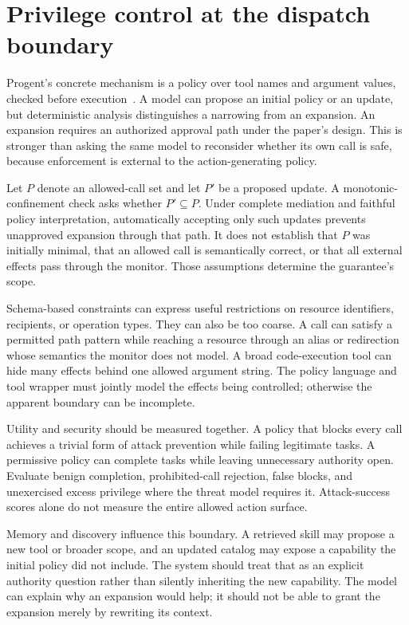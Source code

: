 \section{Privilege control at the dispatch boundary}\label{sec:C18:privilege}
Progent's concrete mechanism is a policy over tool names and argument values, checked before execution~\cite{corpus250411703}. A model can propose an initial policy or an update, but deterministic analysis distinguishes a narrowing from an expansion. An expansion requires an authorized approval path under the paper's design. This is stronger than asking the same model to reconsider whether its own call is safe, because enforcement is external to the action-generating policy.

Let $P$ denote an allowed-call set and let $P'$ be a proposed update. A monotonic-confinement check asks whether $P'\subseteq P$. Under complete mediation and faithful policy interpretation, automatically accepting only such updates prevents unapproved expansion through that path. It does not establish that $P$ was initially minimal, that an allowed call is semantically correct, or that all external effects pass through the monitor. Those assumptions determine the guarantee's scope.

Schema-based constraints can express useful restrictions on resource identifiers, recipients, or operation types. They can also be too coarse. A call can satisfy a permitted path pattern while reaching a resource through an alias or redirection whose semantics the monitor does not model. A broad code-execution tool can hide many effects behind one allowed argument string. The policy language and tool wrapper must jointly model the effects being controlled; otherwise the apparent boundary can be incomplete.

Utility and security should be measured together. A policy that blocks every call achieves a trivial form of attack prevention while failing legitimate tasks. A permissive policy can complete tasks while leaving unnecessary authority open. Evaluate benign completion, prohibited-call rejection, false blocks, and unexercised excess privilege where the threat model requires it. Attack-success scores alone do not measure the entire allowed action surface.

Memory and discovery influence this boundary. A retrieved skill may propose a new tool or broader scope, and an updated catalog may expose a capability the initial policy did not include. The system should treat that as an explicit authority question rather than silently inheriting the new capability. The model can explain why an expansion would help; it should not be able to grant the expansion merely by rewriting its context.

